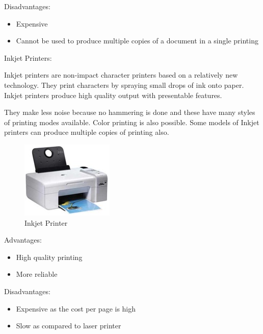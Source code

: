 \documentclass[11pt,a4paper,twoside]{article}
\begin{document}
Disadvantages:
\begin{itemize}
    \item Expensive  
\item Cannot be used to produce multiple copies of a document in a single printing
\end{itemize}
Inkjet Printers:\par
Inkjet printers are non-impact character printers based on a relatively new technology. They print characters by spraying small drops of ink onto paper. Inkjet printers produce high quality output with presentable features.\par
They make less noise because no hammering is done and these have many styles of printing modes available. Color printing is also possible. Some models of Inkjet printers can produce multiple copies of printing also.
\begin{figure}[H]
\centering \includegraphics[scale=1]{Fig 19.jpg}
\caption{Inkjet Printer}
\end{figure}
\noindent Advantages:
\begin{itemize}
    \item High quality printing  
\item More reliable
\end{itemize}
Disadvantages:
\begin{itemize}
    \item Expensive as the cost per page is high  
\item Slow as compared to laser printer
\end{itemize}
\newpage
\end{document}
